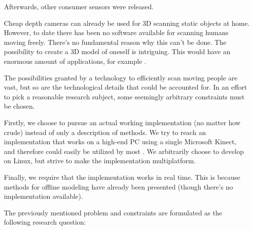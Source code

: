 Afterwards, other consumer sensors were released. 

Cheap depth cameras can already be used for 3D scanning static objects at home. However, to date there has been no software available for scanning humans moving freely. There's no fundamental reason why this can't be done. The possibility to create a 3D model of oneself is intriguing. This would have an enormous amount of applications, for example .


The possibilities granted by a technology to efficiently scan moving people are vast, but so are the technological details that could be accounted for. In an effort to pick a reasonable research subject, some seemingly arbitrary constraints must be chosen.

Firstly, we choose to pursue an actual working implementation (no matter how crude) instead of only a description of methods. We try to reach an implementation that works on a high-end PC using a single Microsoft Kinect, and therefore could easily be utilized by most . We arbitrarily choose to develop on Linux, but strive to make the implementation multiplatform.

Finally, we require that the implementation works in real time. This is because methods for offline modeling have already been presented (though there's no implementation available).

The previously mentioned problem and constraints are formulated as the following research question:

 
